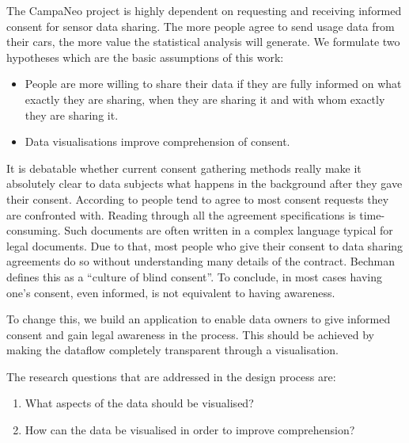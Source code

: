 \documentclass[../paper.tex]{subfiles}
\begin{document}
  The CampaNeo project is highly dependent on requesting and receiving informed
  consent for sensor data sharing. The more people agree to send usage data from
  their cars, the more value the statistical analysis will generate. We
  formulate two hypotheses which are the basic assumptions of this work:

  \begin{itemize}
    \item People are more willing to share their data if they are fully informed
          on what exactly they are sharing, when they are sharing it and with
          whom exactly they are sharing it.
    \item Data visualisations improve comprehension of consent.
  \end{itemize}

  It is debatable whether current consent gathering methods really make it
  absolutely clear to data subjects what happens in the background after they
  gave their consent. According to \cite{Borgesisus_informed_consent_2015} people
  tend to agree to most consent requests they are confronted with.
  Reading through all the agreement specifications is time-consuming. Such
  documents are often written in a complex language typical for legal documents.
  Due to that, most people who give their consent to data sharing agreements do so
  without understanding many details of the contract. Bechman \cite{Bechmann2014}
  defines this as a “culture of blind consent”. To conclude, in most cases having
  one’s consent, even informed, is not equivalent to having awareness.

  To change this, we build an application to enable data owners to give informed
  consent and gain legal awareness in the process. This should be achieved by
  making the dataflow completely transparent through a visualisation.

  The research questions that are addressed in the design process are:

  \begin{enumerate}
    \item What aspects of the data should be visualised?
    \item How can the data be visualised in order to improve comprehension?
  \end{enumerate}
\end{document}
